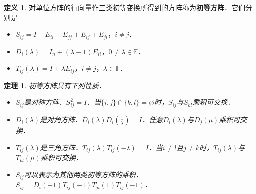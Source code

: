 \documentclass[a4paper,fontset=windows]{ctexbook}
\newtheorem{theorem}{定理}[chapter]
\theoremstyle{definition}
\newtheorem{definition}{定义}[chapter]
\begin{document}
\begin{definition}
对单位方阵的行向量作三类初等变换所得到的方阵称为{\bf 初等方阵}．它们分别是
\begin{itemize}
\item $S_{ij}=I-E_{ii}-E_{jj}+E_{ij}+E_{ji}$，$i\ne j$．
\item $D_i(\lambda)=I_n+(\lambda-1)E_{ii}$，$0\ne\lambda\in\mathbb{F}$．
\item $T_{ij}(\lambda)=I+\lambda E_{ij}$，$i\ne j$，$\lambda\in\mathbb{F}$．
\end{itemize}
\end{definition}

\begin{theorem}\label{thm2.4}
初等方阵具有下列性质．
\begin{itemize}
\item $S_{ij}$是对称方阵．$S_{ij}^2=I$．当$\{i,j\}\cap\{k,l\}=\varnothing$时，$S_{ij}$与$S_{kl}$乘积可交换．
\item $D_i(\lambda)$是对角方阵．$D_i(\lambda)D_i(\frac{1}{\lambda})=I$．任意$D_i(\lambda)$与$D_j(\mu)$乘积可交换．
\item $T_{ij}(\lambda)$是三角方阵．$T_{ij}(\lambda)T_{ij}(-\lambda)=I$．当$i\ne l$且$j\ne k$时，$T_{ij}(\lambda)$与$T_{kl}(\mu)$乘积可交换．
\item $S_{ij}$可以表示为其他两类初等方阵的乘积．$S_{ij}=D_i(-1)T_{ij}(-1)T_{ji}(1)T_{ij}(-1)$．
\end{itemize}
\end{theorem}
\end{document}
